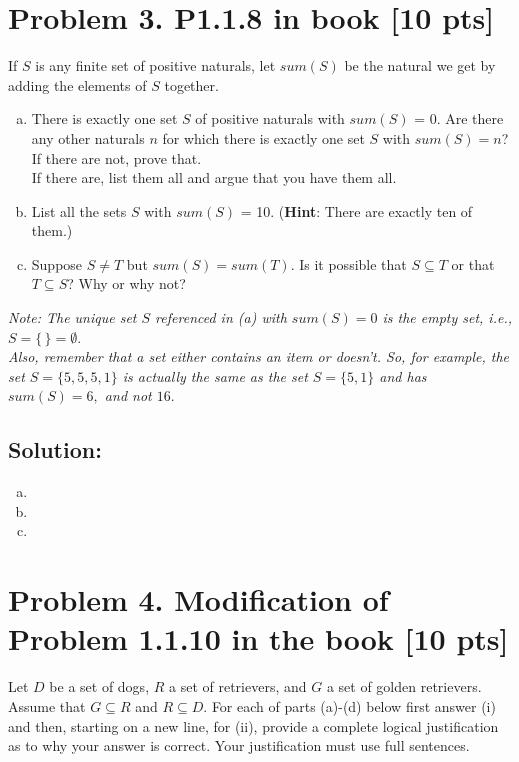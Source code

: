 \documentclass[12pt]{article}
\begin{document}
\newpage
\section*{\textbf{Problem 3. P1.1.8 in book} [10 pts]}

If $S$ is any finite set of positive naturals, let $sum(S)$ be the natural we get by adding the elements of $S$ together.
\begin{enumerate}[(a)]
    \item  There is exactly one set $S$ of positive naturals with $sum(S)$ = 0. Are there any other naturals $n$ for which there is exactly one set $S$ with $sum(S)= n$? \\
    If there are not, prove that.\\
    If there are, list them all and argue that you have them all.

    \item  List all the sets $S$ with $sum(S)$ = 10. (\textbf{Hint}: There are exactly ten of them.)

    \item  Suppose $S \not= T$ but $sum(S)= sum(T)$. Is it possible that $S \subseteq T$ or that $T \subseteq S$? Why or why not?

\end{enumerate}
{\em \small
Note: The unique set $S$ referenced in (a) with $sum(S)=0$ is the empty set, i.e., $S= \{\,\} = \emptyset.$\\
Also, remember that a set either contains an item or doesn't.  
So, for example, the set $S = \{5,5,5, 1\}$ is actually the same as the set $S = \{5,1\}$ and has $sum(S) =6,$ and not $16.$
}

\subsection*{\textbf{Solution:}}
\begin{enumerate}[(a)]
\item 
\item 
\item
\end{enumerate}

\newpage
\section*{\textbf{Problem 4. Modification of Problem 1.1.10  in the book} [10 pts]}

Let $D$  be a set of dogs, $R$ a set of retrievers, and $G$ a set of golden retrievers. Assume that $G \subseteq R$ and $R \subseteq D.$ For each of parts (a)-(d) below first answer (i) and then, starting on a new line, for (ii), provide  a complete logical justification as to why your answer is correct.  Your justification must use full sentences.
\end{document}
